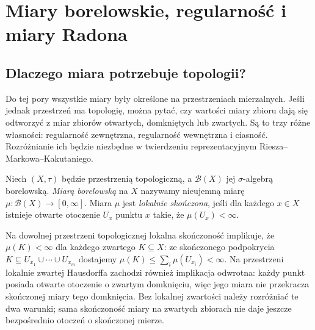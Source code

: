\chapter{Miary borelowskie, regularność i miary Radona}
\label{ch:radon-measures-20}

\section{Dlaczego miara potrzebuje topologii?}
Do tej pory wszystkie miary były określone na przestrzeniach
mierzalnych. Jeśli jednak przestrzeń ma topologię, można pytać,
czy wartości miary zbioru dają się odtworzyć z miar zbiorów
otwartych, domkniętych lub zwartych. Są to trzy różne własności:
regularność zewnętrzna, regularność wewnętrzna i ciasność.
Rozróżnianie ich będzie niezbędne w twierdzeniu reprezentacyjnym
Riesza--Markowa--Kakutaniego.

\begin{definicja}
\label{def:borel-locfinite-20}
Niech $(X,\tau)$ będzie przestrzenią topologiczną,
a $\mathcal B(X)$ jej $\sigma$-algebrą borelowską.
\emph{Miarą borelowską} na $X$ nazywamy nieujemną miarę
$\mu:\mathcal B(X)\to[0,\infty]$.
Miara $\mu$ jest \emph{lokalnie skończona}, jeśli dla
każdego $x\in X$ istnieje otwarte otoczenie $U_x$ punktu $x$
takie, że $\mu(U_x)<\infty$.
\end{definicja}

\begin{uwaga}
\label{rem:compact-finiteness-20}
Na dowolnej przestrzeni topologicznej lokalna skończoność
implikuje, że $\mu(K)<\infty$ dla każdego zwartego
$K\subseteq X$: ze skończonego podpokrycia
$K\subseteq U_{x_1}\cup\cdots\cup U_{x_m}$ dostajemy
$\mu(K)\le\sum_i\mu(U_{x_i})<\infty$.
Na przestrzeni lokalnie zwartej Hausdorffa zachodzi
również implikacja odwrotna: każdy punkt posiada otwarte
otoczenie o zwartym domknięciu, więc jego miara nie
przekracza skończonej miary tego domknięcia.
Bez lokalnej zwartości należy rozróżniać te dwa warunki;
sama skończoność miary na zwartych zbiorach nie daje
jeszcze bezpośrednio otoczeń o skończonej mierze.
\end{uwaga}

